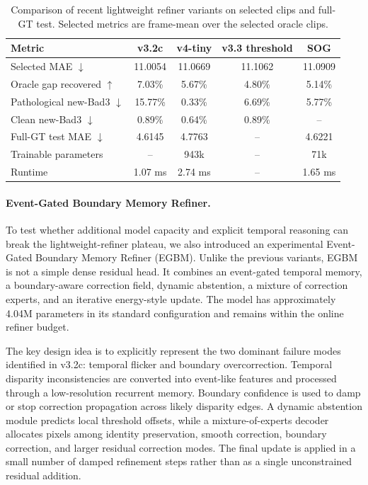 \documentclass[11pt,a4paper]{article}
\begin{document}
\begin{table}[t]
\centering
\caption{Comparison of recent lightweight refiner variants on selected clips and
full-GT test. Selected metrics are frame-mean over the selected oracle clips.}
\label{tab:recent_refiner_variants}
\begin{tabular}{lcccc}
\toprule
Metric & v3.2c & v4-tiny & v3.3 threshold & SOG \\
\midrule
Selected MAE $\downarrow$ & 11.0054 & 11.0669 & 11.1062 & 11.0909 \\
Oracle gap recovered $\uparrow$ & 7.03\% & 5.67\% & 4.80\% & 5.14\% \\
Pathological new-Bad3 $\downarrow$ & 15.77\% & 0.33\% & 6.69\% & 5.77\% \\
Clean new-Bad3 $\downarrow$ & 0.89\% & 0.64\% & 0.89\% & -- \\
Full-GT test MAE $\downarrow$ & 4.6145 & 4.7763 & -- & 4.6221 \\
Trainable parameters & -- & 943k & -- & 71k \\
Runtime & 1.07 ms & 2.74 ms & -- & 1.65 ms \\
\bottomrule
\end{tabular}
\end{table}

\paragraph{Event-Gated Boundary Memory Refiner.}
To test whether additional model capacity and explicit temporal reasoning can
break the lightweight-refiner plateau, we also introduced an experimental
Event-Gated Boundary Memory Refiner (EGBM). Unlike the previous variants, EGBM is
not a simple dense residual head. It combines an event-gated temporal memory, a
boundary-aware correction field, dynamic abstention, a mixture of correction
experts, and an iterative energy-style update. The model has approximately 4.04M
parameters in its standard configuration and remains within the online refiner
budget.

The key design idea is to explicitly represent the two dominant failure modes
identified in v3.2c: temporal flicker and boundary overcorrection. Temporal
disparity inconsistencies are converted into event-like features and processed
through a low-resolution recurrent memory. Boundary confidence is used to damp or
stop correction propagation across likely disparity edges. A dynamic abstention
module predicts local threshold offsets, while a mixture-of-experts decoder
allocates pixels among identity preservation, smooth correction, boundary
correction, and larger residual correction modes. The final update is applied in
a small number of damped refinement steps rather than as a single unconstrained
residual addition.
\end{document}
